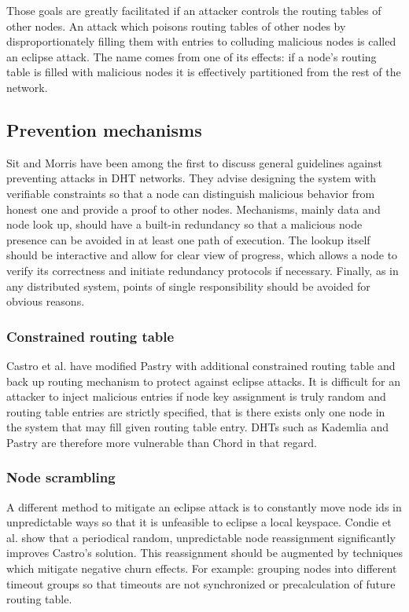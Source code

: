   Those goals are greatly facilitated if an attacker controls the routing tables
  of other nodes. An attack which poisons routing tables of other nodes by
  disproportionately filling them with entries to colluding malicious nodes is
  called an eclipse attack. The name comes from one of its effects: if a node's
  routing table is filled with malicious nodes it is effectively partitioned
  from the rest of the network.

  \subsection{Prevention mechanisms}

  Sit and Morris \cite{sit02} have been among the first to discuss general
  guidelines against preventing attacks in DHT networks. They advise designing
  the system with verifiable constraints so that a node can distinguish
  malicious behavior from honest one and provide a proof to other nodes.
  Mechanisms, mainly data and node look up, should have a built-in redundancy so
  that a malicious node presence can be avoided in at least one path of
  execution. The lookup itself should be interactive and allow for clear view of
  progress, which allows a node to verify its correctness and initiate
  redundancy protocols if necessary. Finally, as in any distributed system,
  points of single responsibility should be avoided for obvious reasons.
  
  \subsubsection{Constrained routing table}
  Castro et al. \cite{cas02} have modified Pastry with additional constrained
  routing table and back up routing mechanism to protect against eclipse
  attacks. It is difficult for an attacker to inject malicious entries if node
  key assignment is truly random and routing table entries are strictly
  specified, that is there exists only one node in the system that may fill
  given routing table entry.  DHTs such as Kademlia and Pastry are therefore
  more vulnerable than Chord in that regard.

  \subsubsection{Node scrambling}
  A different method to mitigate an eclipse attack is to constantly move node
  ids in unpredictable ways so that it is unfeasible to eclipse a local
  keyspace. Condie et al. \cite{con06} show that a periodical random,
  unpredictable node reassignment significantly improves Castro's solution.
  This reassignment should be augmented by techniques which mitigate negative
  churn effects. For example: grouping nodes into different timeout groups so
  that timeouts are not synchronized or precalculation of future routing table.


